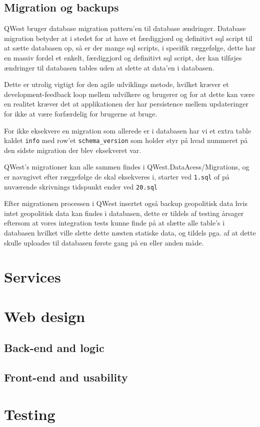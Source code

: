 \subsection{Migration og backups}\label{sec:migration}
QWest bruger database migration pattern'en til database ændringer.
Database migration betyder at i stedet for at have et færdiggjord og definitivt sql script til at sætte databasen op, så er der mange sql scripts, i specifik ræggefølge, dette har en massiv fordel et enkelt, færdiggjord og definitivt sql script, der kan tilføjes ændringer til databasen tables uden at slette at data'en i databasen.

Dette er utrolig vigtigt for den agile udviklings metode, hvilket kræver et development-feedback loop mellem udvilkere og brugerer og for at dette kan være en realitet kræver det at applikationen der har persistence mellem updateringer for ikke at være forfærdelig for brugerne at bruge.

For ikke eksekvere en migration som allerede er i databasen har vi et extra table kaldet \texttt{info} med row'et \texttt{schema\_version} som holder styr på hvad nummeret på den sidste migration der blev eksekveret var.

QWest's migrationer kan alle sammen findes i QWest.DataAcess/Migrations, og er navngivet efter ræggefølge de skal eksekveres i, starter ved \texttt{1.sql} of på nuværende skrivnings tidspunkt ender ved \texttt{20.sql}

Efter migrationen processen i QWest insertet også backup geopolitisk data hvis intet geopolitisk data kan findes i databasen, dette er tildels af testing årsager eftersom at vores integration tests kunne finde på at slætte alle table's i databasen hvilket ville slette dette næsten statiske data, og tildels pga. af at dette skulle uploades til databasen første gang på en eller anden måde.

\section{Services}\label{sec:servicesImp}


\section{Web design}\label{sec:webdesign}
\subsection{Back-end and logic}\label{sec:backend}
\subsection{Front-end and usability}\label{sec:frontend}


\section{Testing}\label{sec:testing}